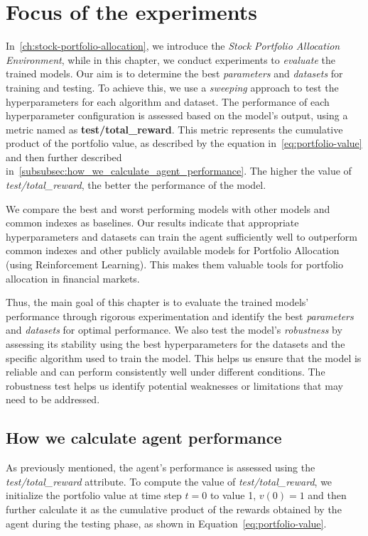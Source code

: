 \documentclass[../xlapes02]{subfiles}
\begin{document}
    \section{Focus of the experiments}\label{sec:focus-of-the-experiments}
    In~\cref{ch:stock-portfolio-allocation}, we introduce the \emph{Stock Portfolio Allocation Environment}, while in this chapter, we conduct experiments to \emph{evaluate} the trained models. Our aim is to determine the best \emph{parameters} and \emph{datasets} for training and testing. To achieve this, we use a \emph{sweeping} approach to test the hyperparameters for each algorithm and dataset. The performance of each hyperparameter configuration is assessed based on the model's output, using a metric named as \textbf{test/total\_reward}. This metric represents the cumulative product of the portfolio value, as described by the equation in~\cref{eq:portfolio-value} and then further described in~\cref{subsubsec:how_we_calculate_agent_performance}. The higher the value of \emph{test/total\_reward}, the better the performance of the model.

    We compare the best and worst performing models with other models and common indexes as baselines. Our results indicate that appropriate hyperparameters and datasets can train the agent sufficiently well to outperform common indexes and other publicly available models for Portfolio Allocation (using Reinforcement Learning). This makes them valuable tools for portfolio allocation in financial markets.

    Thus, the main goal of this chapter is to evaluate the trained models' performance through rigorous experimentation and identify the best \emph{parameters} and \emph{datasets} for optimal performance. We also test the model's \emph{robustness} by assessing its stability using the best hyperparameters for the datasets and the specific algorithm used to train the model. This helps us ensure that the model is reliable and can perform consistently well under different conditions. The robustness test helps us identify potential weaknesses or limitations that may need to be addressed.

    \subsection{How we calculate agent performance}\label{subsec:how_we_calculate_agent_performance}
    As previously mentioned, the agent's performance is assessed using the \emph{test/total\_reward} attribute. To compute the value of \emph{test/total\_reward}, we initialize the portfolio value at time step $t=0$ to value 1, $v(0)=1$ and then further calculate it as the cumulative product of the rewards obtained by the agent during the testing phase, as shown in Equation~\cref{eq:portfolio-value}.
\end{document}
